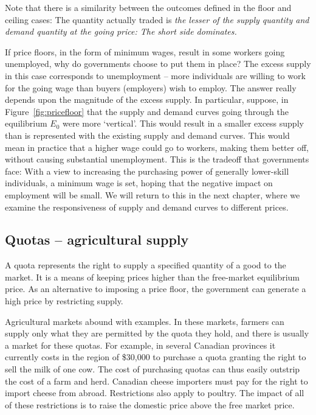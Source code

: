

\newhtmlpage

Note that there is a similarity between the outcomes defined in the floor
and ceiling cases: The quantity actually traded is \textit{the lesser of the
supply quantity and demand quantity at the going price: The short side
dominates.}

If price floors, in the form of minimum wages, result in some workers going
unemployed, why do governments choose to put them in place? The excess
supply in this case corresponds to unemployment -- more individuals are
willing to work for the going wage than buyers (employers) wish to employ.
The answer really depends upon the magnitude of the excess supply. In
particular, suppose, in Figure~\ref{fig:pricefloor} that the supply and demand curves going
through the equilibrium $E_0$ were more `vertical'. This would result in a
smaller excess supply than is represented with the existing supply and
demand curves. This would mean in practice that a higher wage could go to
workers, making them better off, without causing substantial unemployment.
This is the tradeoff that governments face: With a view to increasing the
purchasing power of generally lower-skill individuals, a minimum wage is
set, hoping that the negative impact on employment will be small. We will
return to this in the next chapter, where we examine the responsiveness of
supply and demand curves to different prices.

\newhtmlpage

\subsection*{Quotas -- agricultural supply}

A quota represents the right to supply a specified quantity of a good to the
market. It is a means of keeping prices higher than the free-market
equilibrium price. As an alternative to imposing a price floor, the
government can generate a high price by restricting supply.

Agricultural markets abound with examples. In these markets, farmers can
supply only what they are permitted by the quota they hold, and there is
usually a market for these quotas. For example, in several Canadian
provinces it currently costs in the region of \$30,000 to purchase a quota
granting the right to sell the milk of one cow. The cost of purchasing
quotas can thus easily outstrip the cost of a farm and herd. Canadian cheese
importers must pay for the right to import cheese from abroad. Restrictions
also apply to poultry. The impact of all of these restrictions is to raise
the domestic price above the free market price.

